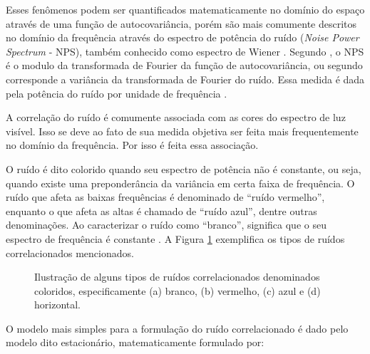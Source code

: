 Esses fenômenos podem ser quantificados matematicamente no domínio do espaço através de uma função de autocovariância, porém são mais comumente descritos no domínio da frequência através do espectro de potência do ruído (\textit{Noise Power Spectrum} - \acs{NPS}), também conhecido como espectro de Wiener \cite[p. 485]{marshall2017handbook}. Segundo , o \acs{NPS} é o modulo da transformada de Fourier da função de autocovariância, ou segundo  corresponde a variância da transformada de Fourier do ruído. Essa medida é dada pela potência do ruído por unidade de frequência \cite{marshall2017handbook}.

A correlação do ruído é comumente associada com as cores do espectro de luz visível. Isso se deve ao fato de sua medida objetiva ser feita mais frequentemente no domínio da frequência. Por isso é feita essa associação. 

O ruído é dito colorido quando seu espectro de potência não é constante, ou seja, quando existe uma preponderância da variância em certa faixa de frequência. O ruído que afeta as baixas frequências é denominado de ``ruído vermelho'', enquanto o que afeta as altas é chamado de ``ruído azul'', dentre outras denominações. Ao caracterizar o ruído como ``branco'', significa que o seu espectro de frequência é constante \cite{marshall2017handbook,bertalmiodenoising2018}. A Figura \ref{fig:imgCapRuidoColoredNoise} exemplifica os tipos de ruídos correlacionados mencionados.


\begin{figure}[H]
	\centering
	
	\caption{Ilustração de alguns tipos de ruídos correlacionados denominados coloridos, especificamente (a) branco, (b) vermelho, (c) azul e (d) horizontal.}
	
	\hfil
	\hfil
	\hfil
	
	\label{fig:imgCapRuidoColoredNoise}
\end{figure}


O modelo mais simples para a formulação do ruído correlacionado é dado pelo modelo dito estacionário, matematicamente formulado por:

